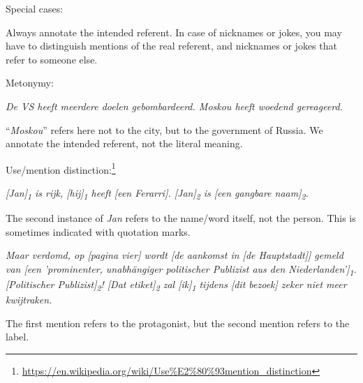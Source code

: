 Special cases:
\begin{itemize*}
\item Always annotate the intended referent. In case of nicknames or jokes,
    you may have to distinguish mentions of the real referent, and nicknames or jokes that refer to someone else.

\item Metonymy:

    \emph{De VS heeft meerdere doelen gebombardeerd. Moskou heeft woedend
  gereageerd.}

  ``\emph{Moskou}'' refers here not to the city, but to the government of
  Russia. We annotate the intended referent, not the literal meaning.

\item Use/mention distinction:\footnote{%
    \url{https://en.wikipedia.org/wiki/Use\%E2\%80\%93mention_distinction}}

    \emph{[Jan]\textsubscript{1} is rijk, [hij]\textsubscript{1} heeft [een Ferarri].
    [Jan]\textsubscript{2} is [een gangbare naam]\textsubscript{2}.}

    The second instance of \emph{Jan} refers to the name/word itself,
    not the person. This is sometimes indicated with quotation marks.

    \emph{Maar verdomd, op [pagina vier] wordt [de aankomst in [de Hauptstadt]] gemeld van [een 'prominenter, unabhängiger politischer Publizist aus den Niederlanden']\textsubscript{1}.
    [Politischer Publizist]\textsubscript{2}!
    [Dat etiket]\textsubscript{2} zal [ik]\textsubscript{1} tijdens [dit bezoek] zeker niet meer kwijtraken.}

    The first mention refers to the protagonist,
    but the second mention refers to the label.

\end{itemize*}


